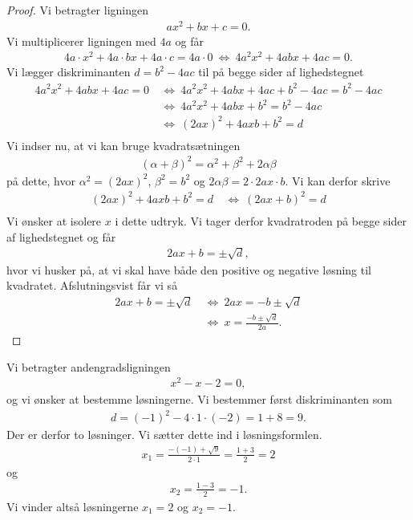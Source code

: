 \begin{proof}
	Vi betragter ligningen
	\begin{align*}
		ax^2 + bx + c = 0.
	\end{align*}
	Vi multiplicerer ligningen med $4a$ og får
	\begin{align*}
		4a\cdot x^2 + 4a\cdot bx + 4a \cdot c = 4a\cdot 0 \ \Leftrightarrow \ 4a^2x^2 + 4abx + 4ac = 0.
	\end{align*}
	Vi lægger diskriminanten $d = b^2 - 4ac$ til på begge sider af lighedstegnet
	\begin{align*}
		4a^2x^2 + 4abx + 4ac = 0 \ &\Leftrightarrow \ 4a^2x^2 + 4abx + 4ac + b^2 - 4ac = b^2 - 4ac \\
		&\Leftrightarrow \ 4a^2x^2 + 4abx + b^2 = b^2 - 4ac \\
		&\Leftrightarrow \ (2ax)^2 + 4axb + b^2 = d\\
	\end{align*}
	Vi indser nu, at vi kan bruge kvadratsætningen
	\begin{align*}
		(\alpha + \beta)^2 = \alpha^2 + \beta^2 + 2\alpha\beta
	\end{align*}
	på dette, hvor $\alpha^2 = (2ax)^2$, $\beta^2 = b^2$ og $2\alpha\beta = 2\cdot 2ax \cdot b$. 
	Vi kan derfor skrive
	\begin{align*}
		(2ax)^2 + 4axb + b^2 = d \ &\Leftrightarrow \ (2ax + b)^2 = d \\
	\end{align*}
	Vi ønsker at isolere $x$ i dette udtryk. Vi tager derfor kvadratroden på begge sider af lighedstegnet og
	får
	\begin{align*}
		2ax + b = \pm \sqrt{d},
	\end{align*}
	hvor vi husker på, at vi skal have både den positive og negative løsning til kvadratet.
	Afslutningsvist får vi så
	\begin{align*}
		2ax + b = \pm \sqrt{d} \ &\Leftrightarrow	\ 2ax =-b \pm \sqrt{d}\\
		&\Leftrightarrow \ x = \frac{-b \pm \sqrt{d}}{2a}.
	\end{align*}
\end{proof}
\begin{exa}
	Vi betragter andengradsligningen 
	\begin{align*}
		x^2 - x - 2 = 0,
	\end{align*}
	og vi ønsker at bestemme løsningerne. Vi bestemmer først diskriminanten som
	\begin{align*}
		d = (-1)^2 - 4\cdot 1 \cdot (-2) = 1 + 8  = 9.
	\end{align*}
	Der er derfor to løsninger. Vi sætter dette ind i løsningsformlen. 
	\begin{align*}
		x_1 = \frac{-(-1)+\sqrt{9}}{2\cdot 1} = \frac{1+3}{2} = 2
	\end{align*}
	og 
	\begin{align*}
		x_2 = \frac{1-3}{2} = -1.
	\end{align*}
	Vi vinder altså løsningerne $x_1 = 2$ og $x_2 = -1$. 
\end{exa}
